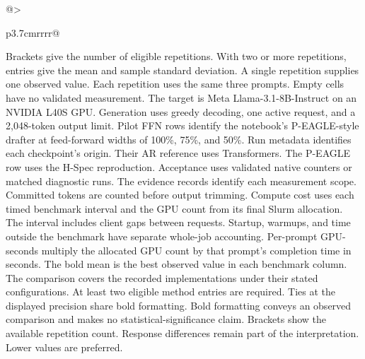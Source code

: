 \begin{table}[!tp]
\begin{tabular}{@{}>{\raggedright\arraybackslash}p{3.7cm}rrrr@{}}
\bottomrule
\end{tabular}
\par\medskip
\begin{minipage}{\linewidth}\footnotesize
Brackets give the number of eligible repetitions. With two or more repetitions, entries give the mean and sample standard deviation. A single repetition supplies one observed value. Each repetition uses the same three prompts. Empty cells have no validated measurement. The target is Meta Llama-3.1-8B-Instruct on an NVIDIA L40S GPU. Generation uses greedy decoding, one active request, and a 2,048-token output limit. Pilot FFN rows identify the notebook's P-EAGLE-style drafter at feed-forward widths of 100\%, 75\%, and 50\%. Run metadata identifies each checkpoint's origin. Their AR reference uses Transformers. The P-EAGLE row uses the H-Spec reproduction. Acceptance uses validated native counters or matched diagnostic runs. The evidence records identify each measurement scope. Committed tokens are counted before output trimming.
Compute cost uses each timed benchmark interval and the GPU count from its final Slurm allocation. The interval includes client gaps between requests. Startup, warmups, and time outside the benchmark have separate whole-job accounting. Per-prompt GPU-seconds multiply the allocated GPU count by that prompt's completion time in seconds.
The bold mean is the best observed value in each benchmark column. The comparison covers the recorded implementations under their stated configurations. At least two eligible method entries are required. Ties at the displayed precision share bold formatting. Bold formatting conveys an observed comparison and makes no statistical-significance claim. Brackets show the available repetition count. Response differences remain part of the interpretation. Lower values are preferred.
\end{minipage}
\end{table}

